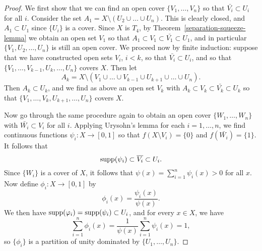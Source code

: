 \begin{proof}
  We first show that we can find an open cover $\{V_1, \dots, V_n\}$ so that $\bar{V_i} \subset U_i$ for all $i$. Consider the set $A_1 = X \setminus (U_2 \cup \dots \cup U_n)$. This is clearly closed, and $A_1 \subset U_1$ since $\{U_i\}$ is a cover. Since $X$ is $T_4$, by Theorem~\ref{separation-squeeze-lemma} we obtain an open set $V_1$ so that $A_1 \subset V_1 \subset \bar{V_1} \subset U_1$, and in particular $\{V_1,U_2,\dots,U_n\}$ is still an open cover. We proceed now by finite induction: suppose that we have constructed open sets $V_i$, $i < k$, so that $\bar{V_i} \subset U_i$, and so that $\{V_1, \dots, V_{k-1},U_k,\dots,U_n\}$ covers $X$. Then let
  \[
    A_k = X \setminus (V_1 \cup \dots \cup V_{k-1} \cup U_{k+1} \cup \dots \cup U_n).
  \]
  Then $A_k \subset U_k$, and we find as above an open set $V_k$ with $A_k \subset V_k \subset \bar{V_k} \subset U_k$ so that $\{V_1, \dots, V_k, U_{k+1}, \dots, U_n\}$ covers $X$.
  
  Now go through the same procedure again to obtain an open cover $\{W_1, \dots, W_n\}$ with $\bar{W_i} \subset V_i$ for all $i$. Applying Urysohn's lemma for each $i = 1, \dots, n$, we find continuous functions $\psi_i : X \to [0,1]$ so that $f(X \setminus V_i) = \{0\}$ and $f(\bar{W_i}) = \{1\}$. It follows that
  \[
    \operatorname{supp}(\psi_i) \subset \overline{V_i} \subset U_i.
  \]
  Since $\{W_i\}$ is a cover of $X$, it follows that $\psi(x) = \sum_{i=1}^n \psi_i(x) > 0$ for all $x$. Now define $\phi_i : X \to [0,1]$ by
  \[
    \phi_i(x) = \frac{\psi_i(x)}{\psi(x)}.
  \]
  We then have $\operatorname{supp}(\varphi_i) = \operatorname{supp}(\psi_i) \subset U_i$, and for every $x \in X$, we have
  \[
    \sum_{i=1}^n \phi_i(x) = \frac{1}{\psi(x)} \sum_{i=1}^n \psi_i(x) = 1,
  \]
  so $\{\phi_i\}$ is a partition of unity dominated by $\{U_1,\dots,U_n\}$.
\end{proof}
